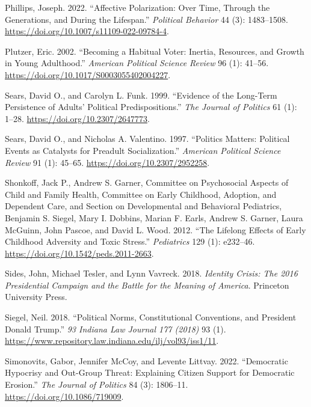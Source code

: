 \documentclass[
  10pt,
  letterpaper,
  DIV=11,
  numbers=noendperiod]{scrartcl}
\newlength{\cslhangindent}
\newenvironment{CSLReferences}[2] %
 {\begin{list}{}{%
  \setlength{\itemindent}{0pt}
  \setlength{\leftmargin}{0pt}
  \setlength{\parsep}{0pt}
  \ifodd #1
   \setlength{\leftmargin}{\cslhangindent}
   \setlength{\itemindent}{-1\cslhangindent}
  \fi
  \setlength{\itemsep}{#2\baselineskip}}}
 {\end{list}}
\begin{document}
\begin{CSLReferences}{1}{0}
Phillips, Joseph. 2022. {``Affective Polarization: Over Time, Through
the Generations, and During the Lifespan.''} \emph{Political Behavior}
44 (3): 1483--1508. \url{https://doi.org/10.1007/s11109-022-09784-4}.

Plutzer, Eric. 2002. {``Becoming a Habitual Voter: Inertia, Resources,
and Growth in Young Adulthood.''} \emph{American Political Science
Review} 96 (1): 41--56. \url{https://doi.org/10.1017/S0003055402004227}.

Sears, David O., and Carolyn L. Funk. 1999. {``Evidence of the Long-Term
Persistence of Adults' Political Predispositions.''} \emph{The Journal
of Politics} 61 (1): 1--28. \url{https://doi.org/10.2307/2647773}.

Sears, David O., and Nicholas A. Valentino. 1997. {``Politics Matters:
Political Events as Catalysts for Preadult Socialization.''}
\emph{American Political Science Review} 91 (1): 45--65.
\url{https://doi.org/10.2307/2952258}.

Shonkoff, Jack P., Andrew S. Garner, Committee on Psychosocial Aspects
of Child and Family Health, Committee on Early Childhood, Adoption, and
Dependent Care, and Section on Developmental and Behavioral Pediatrics,
Benjamin S. Siegel, Mary I. Dobbins, Marian F. Earls, Andrew S. Garner,
Laura McGuinn, John Pascoe, and David L. Wood. 2012. {``The Lifelong
Effects of Early Childhood Adversity and Toxic Stress.''}
\emph{Pediatrics} 129 (1): e232--46.
\url{https://doi.org/10.1542/peds.2011-2663}.

Sides, John, Michael Tesler, and Lynn Vavreck. 2018. \emph{Identity
Crisis: The 2016 Presidential Campaign and the Battle for the Meaning of
America}. Princeton University Press.

Siegel, Neil. 2018. {``Political Norms, Constitutional Conventions, and
President Donald Trump.''} \emph{93 Indiana Law Journal 177 (2018)} 93
(1). \url{https://www.repository.law.indiana.edu/ilj/vol93/iss1/11}.

Simonovits, Gabor, Jennifer McCoy, and Levente Littvay. 2022.
{``Democratic Hypocrisy and Out-Group Threat: Explaining Citizen Support
for Democratic Erosion.''} \emph{The Journal of Politics} 84 (3):
1806--11. \url{https://doi.org/10.1086/719009}.


\end{CSLReferences}
\end{document}

